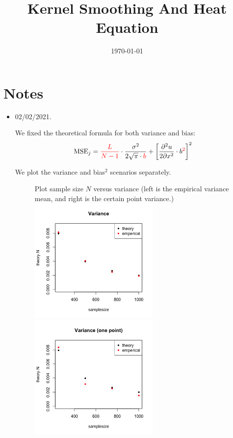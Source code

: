 \documentclass{article}
\title{Kernel Smoothing And Heat Equation}
\date{\today}
\begin{document}
\maketitle

\section{Notes}
\label{sec:notes}

\begin{itemize}

\item 02/02/2021. 

We fixed the theoretical formula for both variance and bias:
\begin{equation}
         \text{MSE}_j=   {\color{red}\frac{L}{N-1}}\cdot \frac{\sigma^2}{2\sqrt{\pi} \cdot {\color{red}b}}  + \left[\frac{\partial^2 u}{2\partial x^2}\cdot b {\color{red}^2} \right]^2
\end{equation}

We plot the variance and bias$^2$ scenarios separately. 

 
\begin{figure}[H]
Plot sample size $N$ versus variance (left is the empirical variance mean, and right is the certain point variance.)\\
\includegraphics[width=2.5in]{pic/variance.png}
\includegraphics[width=2.5in]{pic/variance2.png}
\end{figure}


\end{itemize}
\end{document}
